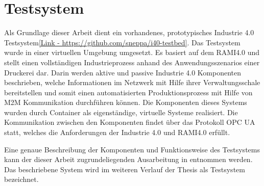 \section{Testsystem}
\label{Grundlagen:Testsystem}
Als Grundlage dieser Arbeit dient ein vorhandenes, prototypisches Industrie 4.0 Testsystem\autoref{Link - https://github.com/sneppa/i40-testbed}. Das Testsystem wurde in einer virtuellen Umgebung umgesetzt. Es basiert auf dem \ac{RAMI4.0} und stellt einen vollständigen Industrieprozess anhand des Anwendungsszenarios einer Druckerei dar. Darin werden aktive und passive Industrie 4.0 Komponenten beschrieben, welche Informationen im Netzwerk mit Hilfe ihrer Verwaltungsschale bereitstellen und somit einen automatisierten Produktionsprozess mit Hilfe von \ac{M2M} Kommunikation durchführen können. Die Komponenten dieses Systems wurden durch Container als eigenständige, virtuelle Systeme realisiert. Die Kommunikation zwischen den Komponenten findet über das Protokoll \ac{OPC UA} statt, welches die Anforderungen der Industrie 4.0 und \ac{RAMI4.0} erfüllt.

Eine genaue Beschreibung der Komponenten und Funktionsweise des Testsystems kann der dieser Arbeit zugrundeliegenden Ausarbeitung in \cite{Weber2018} entnommen werden. Das beschriebene System wird im weiteren Verlauf der Thesis als Testsystem bezeichnet.